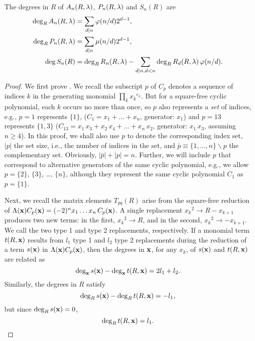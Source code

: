 \documentclass{ws-ijbc}
\begin{document}
\begin{theorem}
The degrees in $R$ of $A_n(R, \lambda)$, $P_n(R, \lambda)$ and $S_n(R)$ are
\begin{subequations}
\begin{align}
\deg_R A_n(R, \lambda) &= \sum_{d|n} \varphi(n/d) 2^{d-1}, \\
\deg_R P_n(R, \lambda) &= \sum_{d|n} \mu(n/d) 2^{d-1}, \\
\deg S_n(R) &= \deg_R R_n(R, \lambda) - \sum_{d | n, d < n} \deg_R R_d(R, \lambda) \, \varphi(n/d).
\end{align}
\label{eq:degR}
\end{subequations}
\label{thm:degR}
\end{theorem}
%
%
%
\begin{proof}
We first prove .
%
We recall the subscript $p$ of $C_p$ denotes a sequence of indices $k$
  in the generating monomial $\prod_k {x_k}^{e_k}$.
But for a square-free cyclic polynomial,
  each $k$ occurs no more than once,
so $p$ also represents a \emph{set} of indices,
%
e.g.,
$p = 1$ represents $\{1\}$,
  ($C_1 = x_1 + \dots + x_n$, generator: $x_1$)
and
$p = 13$ represents $\{1, 3\}$
  ($C_{13} = x_1 \, x_3 + x_2 \, x_4 + \dots + x_n \, x_2$,
  generator: $x_1 \, x_3 $, assuming $n \ge 4$).
%
In this proof,
we shall also use $p$ to denote the corresponding index set,
  $|p|$ the set size, i.e., the number of indices in the set,
  and
  $\bar p \equiv \{1,\ldots,n\} \backslash p$ the complementary set.
%
Obviously, $|\bar p| + |p| = n$.
%
Further, we will include $p$ that correspond to alternative generators
  of the same cyclic polynomial,
e.g., we allow $p = \{2\}$, $\{3\}$, \dots, $\{n\}$,
  although they represent the same cyclic polynomial $C_1$
  as $p = \{1\}$.


Next, we recall the matrix elements $T_{pq}(R)$ arise from the square-free reduction
of $\Lambda(\mathbf{x}) C_p(\mathbf{x}) = (-2)^n x_1 \dots x_n \, C_p(\mathbf{x})$.
%
A single replacement ${x_k}^2 \rightarrow R - x_{k+1}$
produces two new terms:
in the first, ${x_k}^2 \rightarrow R$,
and in the second, ${x_k}^2 \rightarrow - x_{k+1}$.
We call the two type 1 and type 2 replacements, respectively.
%
If a monomial term $t(R, \mathbf{x})$
results from $l_1$ type 1 and $l_2$ type 2 replacements
during the reduction of a term $s(\mathbf{x})$ in $\Lambda(\mathbf{x}) C_p(\mathbf{x})$,
then the degrees in $\mathbf{x}$, for any $x_k$, of $s(\mathbf{x})$ and $t(R, \mathbf{x})$
are related as
%
\begin{equation}
  \deg_{\mathbf{x}} s(\mathbf{x}) - \deg_{\mathbf{x}} t(R, \mathbf{x}) = 2 l_1 + l_2.
\label{eq:degxdiffst}
\end{equation}
%
Similarly, the degrees in $R$ satisfy
\[
  \deg_R s(\mathbf{x}) - \deg_R t(R, \mathbf{x}) = - l_1,
\]
but since $\deg_R s(\mathbf{x}) = 0$,
\begin{equation}
  \deg_R t(R, \mathbf{x}) = l_1.
\label{eq:degRt}
\end{equation}


\end{proof}
\end{document}
